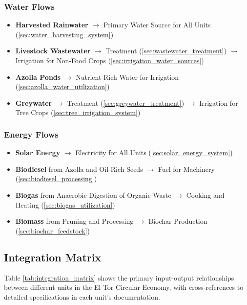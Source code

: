 \subsubsection{Water Flows}
\begin{itemize}
    \item \textbf{Harvested Rainwater} $\rightarrow$ Primary Water Source for All Units (\ref{sec:water_harvesting_system})
    \item \textbf{Livestock Wastewater} $\rightarrow$ Treatment (\ref{sec:wastewater_treatment}) $\rightarrow$ Irrigation for Non-Food Crops (\ref{sec:irrigation_water_sources})
    \item \textbf{Azolla Ponds} $\rightarrow$ Nutrient-Rich Water for Irrigation (\ref{sec:azolla_water_utilization})
    \item \textbf{Greywater} $\rightarrow$ Treatment (\ref{sec:greywater_treatment}) $\rightarrow$ Irrigation for Tree Crops (\ref{sec:tree_irrigation_system})
\end{itemize}

\subsubsection{Energy Flows}
\begin{itemize}
    \item \textbf{Solar Energy} $\rightarrow$ Electricity for All Units (\ref{sec:solar_energy_system})
    \item \textbf{Biodiesel} from Azolla and Oil-Rich Seeds $\rightarrow$ Fuel for Machinery (\ref{sec:biodiesel_processing})
    \item \textbf{Biogas} from Anaerobic Digestion of Organic Waste $\rightarrow$ Cooking and Heating (\ref{sec:biogas_utilization})
    \item \textbf{Biomass} from Pruning and Processing $\rightarrow$ Biochar Production (\ref{sec:biochar_feedstock})
\end{itemize}

\subsection{Integration Matrix}

Table \ref{tab:integration_matrix} shows the primary input-output relationships between different units in the El Tor Circular Economy, with cross-references to detailed specifications in each unit's documentation.

